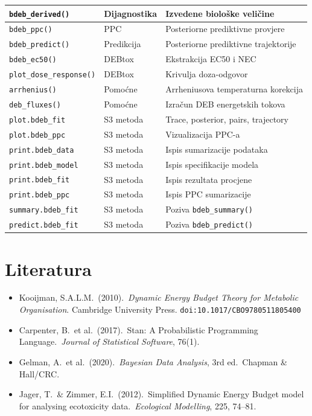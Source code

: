 \documentclass[11pt,a4paper]{article}
\newcommand{\fn}[1]{\texttt{#1()}}
\newcommand{\code}[1]{\texttt{#1}}
\begin{document}
\begin{longtable}{lll}
\fn{bdeb\_derived} & Dijagnostika & Izvedene biološke veličine \\
\midrule
\fn{bdeb\_ppc} & PPC & Posteriorne prediktivne provjere \\
\fn{bdeb\_predict} & Predikcija & Posteriorne prediktivne trajektorije \\
\midrule
\fn{bdeb\_ec50} & DEBtox & Ekstrakcija EC50 i NEC \\
\fn{plot\_dose\_response} & DEBtox & Krivulja doza-odgovor \\
\midrule
\fn{arrhenius} & Pomoćne & Arrheniusova temperaturna korekcija \\
\fn{deb\_fluxes} & Pomoćne & Izračun DEB energetskih tokova \\
\midrule
\code{plot.bdeb\_fit} & S3 metoda & Trace, posterior, pairs, trajectory \\
\code{plot.bdeb\_ppc} & S3 metoda & Vizualizacija PPC-a \\
\code{print.bdeb\_data} & S3 metoda & Ispis sumarizacije podataka \\
\code{print.bdeb\_model} & S3 metoda & Ispis specifikacije modela \\
\code{print.bdeb\_fit} & S3 metoda & Ispis rezultata procjene \\
\code{print.bdeb\_ppc} & S3 metoda & Ispis PPC sumarizacije \\
\code{summary.bdeb\_fit} & S3 metoda & Poziva \fn{bdeb\_summary} \\
\code{predict.bdeb\_fit} & S3 metoda & Poziva \fn{bdeb\_predict} \\
\bottomrule
\end{longtable}


\section*{Literatura}

\begin{itemize}[nosep]
  \item Kooijman, S.A.L.M.\ (2010).\ \textit{Dynamic Energy Budget Theory
    for Metabolic Organisation}.  Cambridge University Press.
    \texttt{doi:10.1017/CBO9780511805400}
  \item Carpenter, B.\ et al.\ (2017).\ Stan: A Probabilistic Programming
    Language.\ \textit{Journal of Statistical Software}, 76(1).
  \item Gelman, A.\ et al.\ (2020).\ \textit{Bayesian Data Analysis},
    3rd ed.\ Chapman \& Hall/CRC.
  \item Jager, T.\ \& Zimmer, E.I.\ (2012).\ Simplified Dynamic Energy
    Budget model for analysing ecotoxicity data.\ \textit{Ecological
    Modelling}, 225, 74--81.
\end{itemize}
\end{document}
